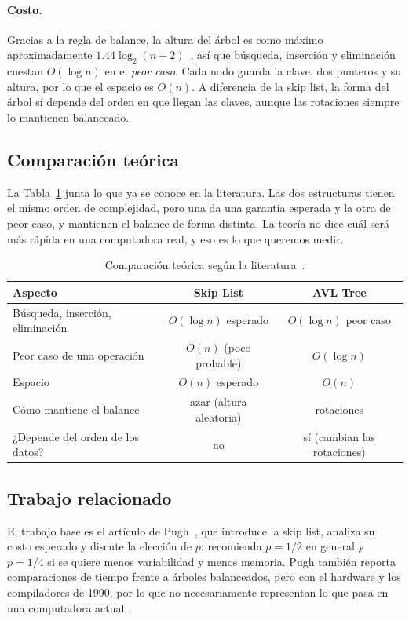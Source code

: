 \documentclass[11pt,a4paper]{article}
\begin{document}
\paragraph{Costo.}
Gracias a la regla de balance, la altura del árbol es como máximo
aproximadamente $1.44 \log_2(n+2)$~\cite{knuth1998}, así que búsqueda,
inserción y eliminación cuestan $O(\log n)$ en el \emph{peor caso}. Cada nodo
guarda la clave, dos punteros y su altura, por lo que el espacio es $O(n)$. A
diferencia de la skip list, la forma del árbol sí depende del orden en que
llegan las claves, aunque las rotaciones siempre lo mantienen balanceado.

\subsection{Comparación teórica}

La Tabla~\ref{tab:teoria} junta lo que ya se conoce en la literatura. Las dos
estructuras tienen el mismo orden de complejidad, pero una da una garantía
esperada y la otra de peor caso, y mantienen el balance de forma distinta.
La teoría no dice cuál será más rápida en una computadora real, y eso es lo
que queremos medir.

\begin{table}[!htb]
\centering
\begin{tabular}{lcc}
\toprule
\textbf{Aspecto} & \textbf{Skip List} & \textbf{AVL Tree} \\
\midrule
Búsqueda, inserción, eliminación & $O(\log n)$ esperado & $O(\log n)$ peor caso \\
Peor caso de una operación       & $O(n)$ (poco probable) & $O(\log n)$ \\
Espacio                          & $O(n)$ esperado & $O(n)$ \\
Cómo mantiene el balance         & azar (altura aleatoria) & rotaciones \\
¿Depende del orden de los datos? & no & sí (cambian las rotaciones) \\
\bottomrule
\end{tabular}
\caption{Comparación teórica según la literatura~\cite{pugh1990,knuth1998}.}
\label{tab:teoria}
\end{table}

\subsection{Trabajo relacionado}

El trabajo base es el artículo de Pugh~\cite{pugh1990}, que introduce la skip
list, analiza su costo esperado y discute la elección de $p$: recomienda
$p = 1/2$ en general y $p = 1/4$ si se quiere menos variabilidad y menos
memoria. Pugh también reporta comparaciones de tiempo frente a árboles
balanceados, pero con el hardware y los compiladores de 1990, por lo que no
necesariamente representan lo que pasa en una computadora actual.
\end{document}
